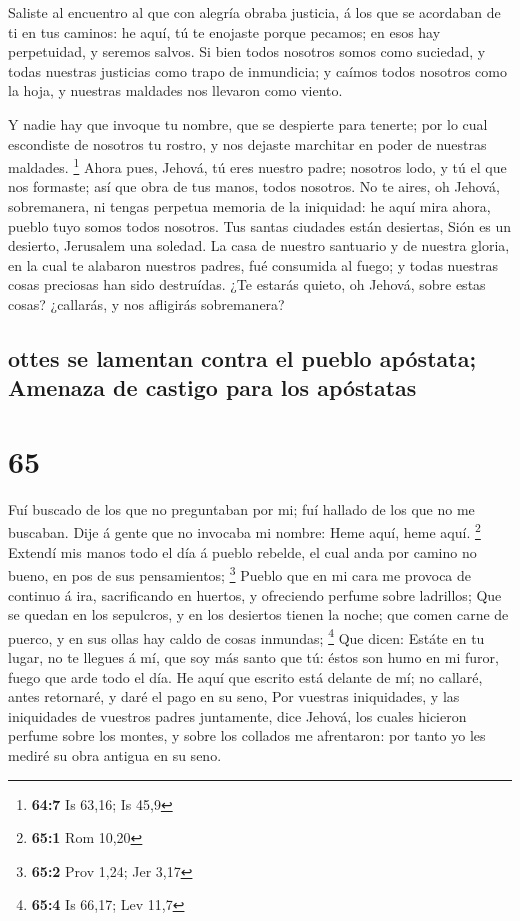  Saliste al encuentro al que con alegría obraba justicia,
á los que se acordaban de ti en tus caminos: he aquí, tú te enojaste
porque pecamos; en esos hay perpetuidad, y seremos salvos.
 Si bien todos nosotros somos como suciedad, y todas
nuestras justicias como trapo de inmundicia; y caímos todos nosotros
como la hoja, y nuestras maldades nos llevaron como viento.

 Y nadie hay que invoque tu nombre, que se despierte para
tenerte; por lo cual escondiste de nosotros tu rostro, y nos dejaste
marchitar en poder de nuestras maldades. \footnote{\textbf{64:7} Is
  63,16; Is 45,9}  Ahora pues, Jehová, tú eres nuestro
padre; nosotros lodo, y tú el que nos formaste; así que obra de tus
manos, todos nosotros.  No te aires, oh Jehová,
sobremanera, ni tengas perpetua memoria de la iniquidad: he aquí mira
ahora, pueblo tuyo somos todos nosotros.  Tus santas
ciudades están desiertas, Sión es un desierto, Jerusalem una soledad.
 La casa de nuestro santuario y de nuestra gloria, en la
cual te alabaron nuestros padres, fué consumida al fuego; y todas
nuestras cosas preciosas han sido destruídas.  ¿Te
estarás quieto, oh Jehová, sobre estas cosas? ¿callarás, y nos afligirás
sobremanera?

\hypertarget{ottes-se-lamentan-contra-el-pueblo-apuxf3stata-amenaza-de-castigo-para-los-apuxf3statas}{%
\subsection{ottes se lamentan contra el pueblo apóstata; Amenaza de
castigo para los
apóstatas}\label{ottes-se-lamentan-contra-el-pueblo-apuxf3stata-amenaza-de-castigo-para-los-apuxf3statas}}

\hypertarget{section-64}{%
\section{65}\label{section-64}}

 Fuí buscado de los que no preguntaban por mi; fuí hallado
de los que no me buscaban. Dije á gente que no invocaba mi nombre: Heme
aquí, heme aquí. \footnote{\textbf{65:1} Rom 10,20} 
Extendí mis manos todo el día á pueblo rebelde, el cual anda por camino
no bueno, en pos de sus pensamientos; \footnote{\textbf{65:2} Prov 1,24;
  Jer 3,17}  Pueblo que en mi cara me provoca de continuo
á ira, sacrificando en huertos, y ofreciendo perfume sobre ladrillos;
 Que se quedan en los sepulcros, y en los desiertos tienen
la noche; que comen carne de puerco, y en sus ollas hay caldo de cosas
inmundas; \footnote{\textbf{65:4} Is 66,17; Lev 11,7}  Que
dicen: Estáte en tu lugar, no te llegues á mí, que soy más santo que tú:
éstos son humo en mi furor, fuego que arde todo el día. 
He aquí que escrito está delante de mí; no callaré, antes retornaré, y
daré el pago en su seno,  Por vuestras iniquidades, y las
iniquidades de vuestros padres juntamente, dice Jehová, los cuales
hicieron perfume sobre los montes, y sobre los collados me afrentaron:
por tanto yo les mediré su obra antigua en su seno.

